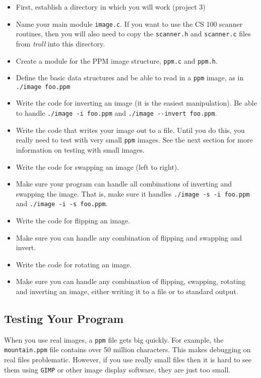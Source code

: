 \documentclass[12pt]{article}
\begin{document}
\begin{itemize}
\item First, establish a directory in which you will work (project 3)
\item Name your main module {\tt image.c}.
If you want to use the CS 100 scanner routines, then you
will also need to copy the {\tt scanner.h} and
{\tt scanner.c} files from {\it troll} into this directory.
\item Create a module for the PPM image structure, 
{\tt ppm.c} and {\tt ppm.h}.
\item Define the basic data structures and be able to read in a {\tt ppm} image,
as in {\tt ./image foo.ppm}
\item Write the code for inverting an image (it is the easiest manipulation).
Be able to handle {\tt ./image -i foo.ppm} and {\tt ./image -{}-invert foo.ppm}.
\item Write the code that writes your image out to a file.  Until you do this,
you really need to test with very small {\tt ppm} images.  See the next section
for more information on testing with small images.
\item Write the code for swapping an image (left to right).  
\item Make sure your program can handle all combinations of inverting and swapping
the image.  That is, make sure it handles {\tt ./image -s -i foo.ppm} and
{\tt ./image -i -s foo.ppm}.
\item Write the code for flipping an image.
\item Make sure you can handle any combination of flipping and swapping and invert.
\item Write the code for rotating an image.
\item Make sure you can handle any combination of flipping, swapping, rotating and
inverting an image, either writing it to a file or to standard output.
\end{itemize}

\subsection*{Testing Your Program}

When you use real images, a {\tt ppm} file gets big quickly.  For example,
the {\tt mountain.ppm} file contains over 50 million characters.  This makes
debugging on real files problematic.  However, if you use really small files
then it is hard to see them using {\tt GIMP} or other image display software,
they are just too small.
\end{document}
